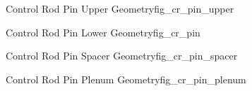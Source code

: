 \begin{geoitem}{Control Rod Pin Upper Geometry}{fig_cr_pin_upper}\centering

\end{geoitem}
\begin{geoitem}{Control Rod Pin Lower Geometry}{fig_cr_pin}\centering

\end{geoitem}
\begin{geoitem}{Control Rod Pin Spacer Geometry}{fig_cr_pin_spacer}\centering

\end{geoitem}
\begin{geoitem}{Control Rod Pin Plenum Geometry}{fig_cr_pin_plenum}\centering

\end{geoitem}
